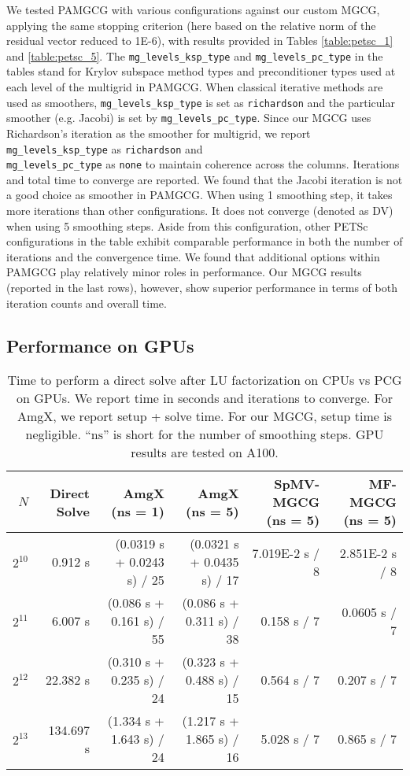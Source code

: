 We tested PAMGCG with various configurations against our custom MGCG, applying the same stopping criterion (here based on the relative norm of the residual vector reduced to 1E-6), with results provided in Tables \ref{table:petsc_1} and \ref{table:petsc_5}.
The \texttt{mg\_levels\_ksp\_type} and \texttt{mg\_levels\_pc\_type} in the tables stand for Krylov subspace method types and preconditioner types used at each level of the multigrid in PAMGCG. When classical iterative methods are used as smoothers, \texttt{mg\_levels\_ksp\_type} is set as \texttt{richardson} and the particular smoother (e.g. Jacobi) is set by \texttt{mg\_levels\_pc\_type}.
Since our MGCG uses Richardson's iteration as the smoother for multigrid, we report \texttt{mg\_levels\_ksp\_type} as \texttt{richardson} and \\
\texttt{mg\_levels\_pc\_type} as \texttt{none} to maintain coherence across the columns. Iterations and total time to converge are reported.
We found that the Jacobi iteration is not a good choice as smoother in PAMGCG. 
When using 1 smoothing step, it takes more iterations than other configurations.
It does not converge (denoted as DV) when using 5 smoothing steps.
Aside from this configuration, other PETSc configurations in the table exhibit comparable performance in both the number of iterations and the convergence time. We found that additional options within PAMGCG play relatively minor roles in performance. Our MGCG results (reported in the last rows), however, show superior performance in terms of both iteration counts and overall time. 


\subsection{Performance on GPUs}
\begin{table*}
    \caption{Time to perform a direct solve after LU factorization on CPUs vs PCG on GPUs. We report time in seconds and iterations to converge. For AmgX, we report setup + solve time. For our MGCG, setup time is negligible. ``$\mathrm{ns}$'' is short for the number of smoothing steps. GPU results are tested on A100.}
    \small
    \centering
    \begin{tabular}{rrrrrr}
    \toprule
    $N$     & Direct Solve  & AmgX (ns = 1) & AmgX (ns = 5)  & SpMV-MGCG (ns = 5)   & MF-MGCG (ns = 5)\\
    \midrule
    $2^{10}$  &   0.912 s & (0.0319 s + 0.0243 s) / 25  & (0.0321 s + 0.0435 s) / 17  & 7.019E-2 s / 8   & 2.851E-2 s / 8       \\
    $2^{11}$ & 6.007 s &  (0.086 s + 0.161 s) / 55   &  (0.086 s + 0.311 s) / 38   & 0.158 s / 7  & 0.0605 s / 7     \\
    $2^{12}$ & 22.382 s  & (0.310 s + 0.235 s) / 24  &  (0.323 s + 0.488 s) / 15      & 0.564 s / 7  & 0.207 s / 7         \\
    $2^{13}$ & 134.697 s  & (1.334 s + 1.643 s) / 24   & (1.217 s + 1.865 s) / 16   & 5.028 s / 7   & 0.865 s / 7      \\
    \bottomrule
    \end{tabular}
    \label{tab:mgcg}
    
\end{table*}

